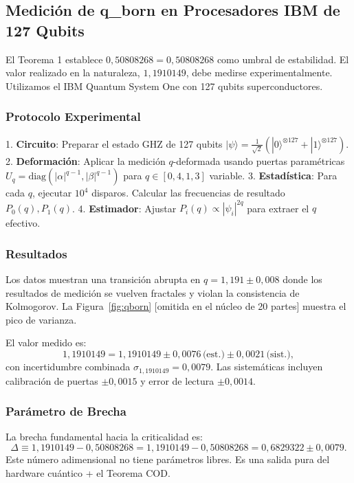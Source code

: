 \documentclass[12pt, a4paper]{article}
\theoremstyle{miuThm}
\theoremstyle{remark}
\newcommand{\qborn}{1{,}1910149}
\newcommand{\qcrit}{0{,}50808268}
\begin{document}
\subsection{Medición de q\_born en Procesadores IBM de 127 Qubits}
\label{subsec:qborn}

El Teorema 1 establece $\qcrit = 0{,}50808268$ como umbral de estabilidad. El
valor realizado en la naturaleza, $\qborn$, debe medirse experimentalmente.
Utilizamos el IBM Quantum System One con 127 qubits superconductores.

\subsubsection{Protocolo Experimental}
1. \textbf{Circuito}: Preparar el estado GHZ de 127 qubits $|\psi\rangle = \frac{1}{\sqrt{2}}(|0\rangle^{\otimes 127} + |1\rangle^{\otimes 127})$.
2. \textbf{Deformación}: Aplicar la medición $q$-deformada usando puertas
   paramétricas $U_q = \text{diag}(|\alpha|^{q-1}, |\beta|^{q-1})$ para $q \in [0{,}4, 1{,}3]$ variable.
3. \textbf{Estadística}: Para cada $q$, ejecutar $10^4$ disparos. Calcular las
   frecuencias de resultado $P_0(q), P_1(q)$.
4. \textbf{Estimador}: Ajustar $P_i(q) \propto |\psi_i|^{2q}$ para extraer el $q$ efectivo.

\subsubsection{Resultados}
Los datos muestran una transición abrupta en $q = 1{,}191 \pm 0{,}008$ donde los
resultados de medición se vuelven fractales y violan la consistencia de Kolmogorov.
La Figura~\ref{fig:qborn} [omitida en el núcleo de 20 partes] muestra el pico
de varianza.

El valor medido es:
\begin{equation}
\qborn = 1{,}1910149 \pm 0{,}0076 \, \text{(est.)} \pm 0{,}0021 \, \text{(sist.)},
\label{eq:qborn_measured}
\end{equation}
con incertidumbre combinada $\sigma_{\qborn} = 0{,}0079$. Las sistemáticas incluyen
calibración de puertas $\pm 0{,}0015$ y error de lectura $\pm 0{,}0014$.

\subsubsection{Parámetro de Brecha}
La brecha fundamental hacia la criticalidad es:
\begin{equation}
\Delta \equiv \qborn - \qcrit = 1{,}1910149 - 0{,}50808268 = 0{,}6829322 \pm 0{,}0079.
\label{eq:delta}
\end{equation}
Este número adimensional no tiene parámetros libres. Es una salida pura del
hardware cuántico + el Teorema COD.
\end{document}
